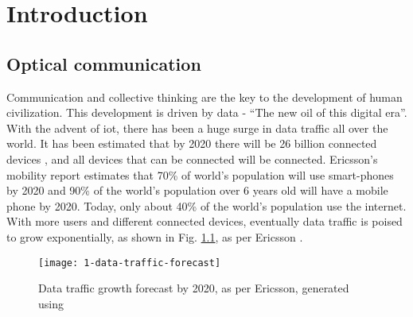 \documentclass[../report.tex]{subfiles}
\begin{document}
	

	
\chapter{Introduction} 
	\section{Optical communication}
Communication and collective thinking are the key to the development of human civilization. This development is driven by data - “The new oil of this digital era”. With the advent of \gls{iot}, there has been a huge surge in data traffic all over the world. It has been estimated that by 2020 there will be 26 billion connected devices \cite{gartner_iot}, and all devices that can be connected will be connected. Ericsson's mobility report \cite{ericsson_mobility_report} estimates that 70\% of world's population will use smart-phones by 2020 and 90\% of the world's population over 6 years old will have a mobile phone by 2020. Today, only about 40\% \cite{internet_users} of the world’s population use the internet. With more users and different connected devices, eventually data traffic is poised to grow exponentially, as shown in Fig. \ref{fig:1_data_traffic_forecast}, as per Ericsson \cite{ericsson_traffic_exploration}.

\begin{figure}[h]
	\centering
	\texttt{[image: 1-data-traffic-forecast]}
	\caption{Data traffic growth forecast by 2020, as per Ericsson, generated using \cite{ericsson_traffic_exploration}}
	\label{fig:1_data_traffic_forecast}
\end{figure}
\end{document}
